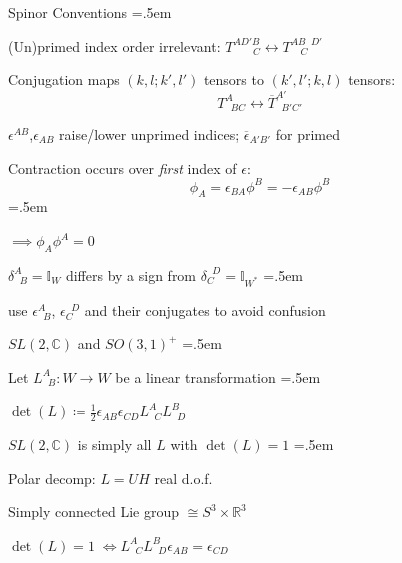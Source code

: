 \documentclass[xcolor={dvipsnames}]{beamer}
\let\olditemize=\itemize
\let\endolditemize=\enditemize
\renewenvironment{itemize}{\olditemize \itemsep=.5em }{\endolditemize}
\begin{document}
\begin{frame}{Spinor Conventions}
    \begin{itemize}
        \item<2-> (Un)primed index order irrelevant: $T_{\qquad C}^{AD'B} \leftrightarrow T_{\quad C}^{AB\;\;D'}$ 
        \item<3-> Conjugation maps $(k,l;k',l')$ tensors to $(k',l';k,l)$ tensors: $$T_{\;\;BC}^A \leftrightarrow \overline{T}_{\;\;B'C'}^{A'}$$
        \item<3-> $\epsilon^{AB}$,$\epsilon_{AB}$ raise/lower unprimed indices; $\overline{\epsilon}_{A'B'}$ for primed
        \item<4-> Contraction occurs over \textit{first} index of $\epsilon$: \[ \phi_A = \epsilon_{BA}\phi^B = -\epsilon_{AB}\phi^{B} \]
        \begin{itemize}
            \item<5-> $\implies \phi_A \phi^A = 0$
        \end{itemize}
        \item<6-> $\delta_{\;\;B}^A = \mathbb{I}_W$ differs by a sign from $\delta_C^{\;\;D} = \mathbb{I}_{W^*}$
        \begin{itemize}
            \item<7-> \textrightarrow\; use $\epsilon_{\;\;B}^A$, $\epsilon_C^{\;\;D}$ and their conjugates to avoid confusion
        \end{itemize}
    \end{itemize}
\end{frame}

\begin{frame}{$SL(2, \mathbb{C})$ and $SO(3, 1)^+$}
    \begin{itemize}
        \item<2-> Let $L_{\;\;B}^A : W\rightarrow W$ be a linear transformation
        \begin{itemize}
            \item<3-> $\det(L) \coloneqq \frac{1}{2}\epsilon_{AB}\epsilon_{CD}L_{\;\;C}^AL_{\;\;D}^B$
        \end{itemize}
        \item<4-> $SL(2, \mathbb{C})$ is simply all $L$ with $\det(L) = 1$
        \begin{itemize}
            \item<5-> Polar decomp: $L = UH$ \textrightarrow{} real d.o.f.
            \item<6-> Simply connected Lie group $\cong S^3\times\mathbb{R}^3$
            \item<7-> $\det(L)=1 \; \iff L_{\;\;C}^A L_{\;\;D}^B \epsilon_{AB} = \epsilon_{CD}$
        \end{itemize}
    \end{itemize}
\end{frame}
\end{document}
